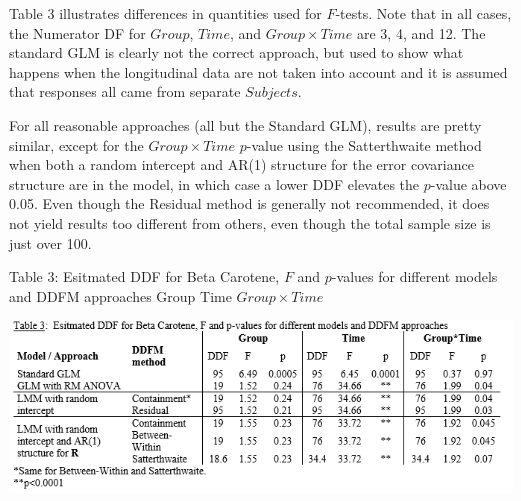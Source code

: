 \documentclass[
  9pt,
  ignorenonframetext,
]{beamer}
\begin{document}
\begin{frame}{}
\protect\hypertarget{section-4}{}
Table 3 illustrates differences in quantities used for \(F\)-tests. Note
that in all cases, the Numerator DF for \(Group\), \(Time\), and
\(Group \times Time\) are 3, 4, and 12. The standard GLM is clearly not
the correct approach, but used to show what happens when the
longitudinal data are not taken into account and it is assumed that
responses all came from separate \(Subjects\).

For all reasonable approaches (all but the Standard GLM), results are
pretty similar, except for the \(Group \times Time\) \(p\)-value using
the Satterthwaite method when both a random intercept and AR(1)
structure for the error covariance structure are in the model, in which
case a lower DDF elevates the \(p\)-value above 0.05. Even though the
Residual method is generally not recommended, it does not yield results
too different from others, even though the total sample size is just
over 100.

\begin{block}{Table 3: Esitmated DDF for Beta Carotene, \(F\) and
\(p\)-values for different models and DDFM approaches Group Time
\(Group \times Time\)}
\protect\hypertarget{table-3-esitmated-ddf-for-beta-carotene-f-and-p-values-for-different-models-and-ddfm-approaches-group-time-group-times-time}{}
\begin{center}\includegraphics[width=0.8\linewidth]{figs_L6/t3} \end{center}
\end{block}
\end{frame}
\end{document}
